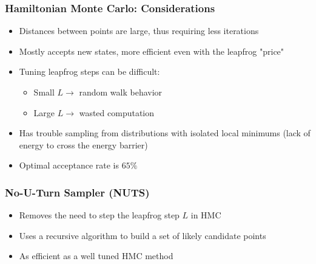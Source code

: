\documentclass{beamer}
\begin{document}
\begin{frame}
  \frametitle{Hamiltonian Monte Carlo: Considerations}
  \begin{itemize}
    \item Distances between points are large, thus requiring less iterations
    \item Mostly accepts new states, more efficient even with the leapfrog "price"
    \item Tuning leapfrog steps can be difficult:
    \begin{itemize}
      \item Small $L \rightarrow$ random walk behavior
      \item Large $L \rightarrow$ wasted computation
    \end{itemize}
    \item Has trouble sampling from distributions with isolated local minimums (lack of energy to cross the energy barrier)
    \item Optimal acceptance rate is $65\%$
  \end{itemize}
\end{frame}

\begin{frame}
  \frametitle{No-U-Turn Sampler (NUTS)}
  \begin{itemize}
    \item Removes the need to step the leapfrog step $L$ in HMC
    \item Uses a recursive algorithm to build a set of likely candidate points
    \item As efficient as a well tuned HMC method
  \end{itemize}
\end{frame}


\end{document}
